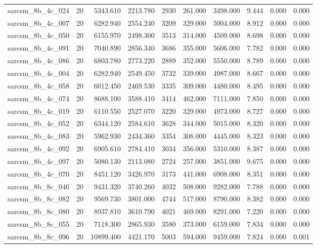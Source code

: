 \begin{tabular}{lrrrrrrrrr}
sarcsm\_8b\_4c\_024 & 20 & 5343.610 & 2213.780 & 2930 & 261.000 & 3498.000 & 9.444 & 0.000 & 0.000 \\
sarcsm\_8b\_4c\_007 & 20 & 6282.940 & 2554.240 & 3209 & 329.000 & 5004.000 & 8.912 & 0.000 & 0.000 \\
sarcsm\_8b\_4c\_050 & 20 & 6155.970 & 2498.300 & 3513 & 314.000 & 4509.000 & 8.698 & 0.000 & 0.000 \\
sarcsm\_8b\_4c\_091 & 20 & 7040.890 & 2856.340 & 3686 & 355.000 & 5606.000 & 7.782 & 0.000 & 0.000 \\
sarcsm\_8b\_4c\_086 & 20 & 6803.780 & 2773.220 & 2889 & 352.000 & 5550.000 & 8.789 & 0.000 & 0.000 \\
sarcsm\_8b\_4c\_004 & 20 & 6282.940 & 2549.450 & 3732 & 339.000 & 4987.000 & 8.667 & 0.000 & 0.000 \\
sarcsm\_8b\_4c\_058 & 20 & 6012.450 & 2469.530 & 3335 & 309.000 & 4480.000 & 8.495 & 0.000 & 0.000 \\
sarcsm\_8b\_4c\_074 & 20 & 8688.100 & 3588.410 & 3414 & 462.000 & 7111.000 & 7.850 & 0.000 & 0.000 \\
sarcsm\_8b\_4c\_019 & 20 & 6110.550 & 2527.070 & 3220 & 329.000 & 4973.000 & 8.727 & 0.000 & 0.000 \\
sarcsm\_8b\_4c\_052 & 20 & 6344.120 & 2584.610 & 3628 & 344.000 & 5015.000 & 8.320 & 0.000 & 0.000 \\
sarcsm\_8b\_4c\_083 & 20 & 5962.930 & 2434.360 & 3354 & 308.000 & 4445.000 & 8.323 & 0.000 & 0.000 \\
sarcsm\_8b\_4c\_092 & 20 & 6905.610 & 2784.410 & 3034 & 356.000 & 5310.000 & 8.387 & 0.000 & 0.000 \\
sarcsm\_8b\_4c\_097 & 20 & 5080.130 & 2113.080 & 2724 & 257.000 & 3851.000 & 9.675 & 0.000 & 0.000 \\
sarcsm\_8b\_4c\_070 & 20 & 8451.120 & 3426.970 & 3173 & 441.000 & 6908.000 & 8.351 & 0.000 & 0.000 \\
sarcsm\_8b\_8c\_046 & 20 & 9431.320 & 3740.260 & 4032 & 508.000 & 9282.000 & 7.788 & 0.000 & 0.000 \\
sarcsm\_8b\_8c\_082 & 20 & 9569.730 & 3801.000 & 4744 & 517.000 & 8790.000 & 8.382 & 0.000 & 0.000 \\
sarcsm\_8b\_8c\_080 & 20 & 8937.810 & 3610.790 & 4021 & 469.000 & 8291.000 & 7.220 & 0.000 & 0.000 \\
sarcsm\_8b\_8c\_055 & 20 & 7118.300 & 2865.930 & 3580 & 373.000 & 6159.000 & 7.834 & 0.000 & 0.000 \\
sarcsm\_8b\_8c\_096 & 20 & 10899.400 & 4421.170 & 5003 & 594.000 & 9459.000 & 7.824 & 0.000 & 0.001 \\

\end{tabular}
